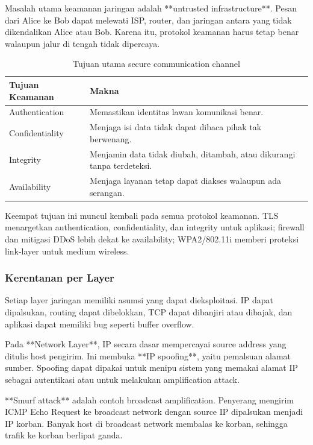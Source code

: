 Masalah utama keamanan jaringan adalah **untrusted infrastructure**. Pesan dari Alice ke Bob dapat melewati ISP, router, dan jaringan antara yang tidak dikendalikan Alice atau Bob. Karena itu, protokol keamanan harus tetap benar walaupun jalur di tengah tidak dipercaya.

\begin{table}[H]
\centering
\begin{tabularx}{\textwidth}{|L{0.26\textwidth}|X|}
\hline
\textbf{Tujuan Keamanan} & \textbf{Makna} \\
\hline
Authentication & Memastikan identitas lawan komunikasi benar. \\
\hline
Confidentiality & Menjaga isi data tidak dapat dibaca pihak tak berwenang. \\
\hline
Integrity & Menjamin data tidak diubah, ditambah, atau dikurangi tanpa terdeteksi. \\
\hline
Availability & Menjaga layanan tetap dapat diakses walaupun ada serangan. \\
\hline
\end{tabularx}
\caption{Tujuan utama secure communication channel}
\label{tab:security-goals}
\end{table}

Keempat tujuan ini muncul kembali pada semua protokol keamanan. TLS menargetkan authentication, confidentiality, dan integrity untuk aplikasi; firewall dan mitigasi DDoS lebih dekat ke availability; WPA2/802.11i memberi proteksi link-layer untuk medium wireless.

\subsubsection{Kerentanan per Layer}
\begin{jawab}
Setiap layer jaringan memiliki asumsi yang dapat dieksploitasi. IP dapat dipalsukan, routing dapat dibelokkan, TCP dapat dibanjiri atau dibajak, dan aplikasi dapat memiliki bug seperti buffer overflow.
\end{jawab}

Pada **Network Layer**, IP secara dasar mempercayai source address yang ditulis host pengirim. Ini membuka **IP spoofing**, yaitu pemalsuan alamat sumber. Spoofing dapat dipakai untuk menipu sistem yang memakai alamat IP sebagai autentikasi atau untuk melakukan amplification attack.

**Smurf attack** adalah contoh broadcast amplification. Penyerang mengirim ICMP Echo Request ke broadcast network dengan source IP dipalsukan menjadi IP korban. Banyak host di broadcast network membalas ke korban, sehingga trafik ke korban berlipat ganda.

